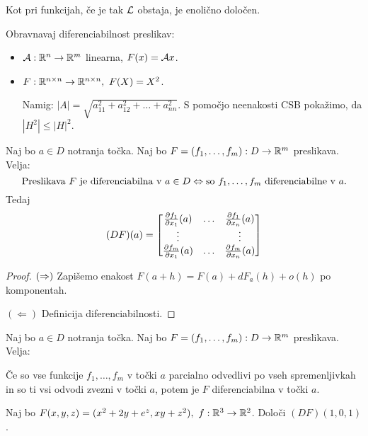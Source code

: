 \begin{opomba}
    Kot pri funkcijah, če je tak $\mathcal{L}$ obstaja, je enolično določen.
\end{opomba}

\begin{zgled}
    Obravnavaj diferenciabilnost preslikav:
    \begin{itemize}
        \item $\mathcal{A}: \mathbb{R}^n \to \mathbb{R}^m$ linearna, $F(x) = \mathcal{A}x$.
        \item $F: \mathbb{R}^{n \times n} \to \mathbb{R}^{n \times n}, \ F(X) = X^2$. 
        
        Namig: $|A| = \sqrt{a_{11}^2 + a_{12}^2 + \ldots + a_{nn}^2}$. S pomočjo neenakosti CSB pokažimo, da $|H^2| \leq |H|^2$.
    \end{itemize}
\end{zgled}

\newpage
\begin{izrek}
    Naj bo $a \in D$ notranja točka. Naj bo $F = (f_1, \ldots, f_m): D \to \mathbb{R}^m$ preslikava. Velja: 
    $$\text{Preslikava } F \text{ je diferenciabilna v } a \in D \Leftrightarrow \text{so } f_1, \ldots, f_m \text{ diferenciabilne v } a.$$
    Tedaj
    $$(DF)(a) = \begin{bmatrix}
        \frac{\partial f_1}{\partial x_1}(a) & \ldots & \frac{\partial f_1}{\partial x_n}(a) \\
        \vdots & & \vdots \\
        \frac{\partial f_m}{\partial x_1}(a) & \ldots & \frac{\partial f_m}{\partial x_n}(a) 
    \end{bmatrix}$$
\end{izrek}

\begin{proof}
    $(\Rightarrow)$ Zapišemo enakost $F(a+h) = F(a) + dF_a(h) + o(h)$ po komponentah.

    $(\Leftarrow)$ Definicija diferenciabilnosti.
\end{proof}

\begin{posledica}
    Naj bo $a \in D$ notranja točka. Naj bo $F = (f_1, \ldots, f_m): D \to \mathbb{R}^m$ preslikava. Velja:
    
    Če so vse funkcije $f_1, \ldots, f_m$ v točki $a$ parcialno odvedlivi po vseh spremenljivkah in so ti vsi odvodi zvezni v točki $a$, potem je $F$ diferenciabilna v točki $a$.
\end{posledica}

\begin{zgled}
    Naj bo $F(x,y,z) = (x^2+2y+e^z, xy+z^2), \ f: \RR^3 \to \RR^2$. Določi $(DF)(1,0,1)$.
\end{zgled}

